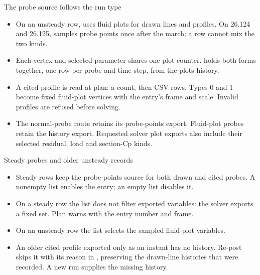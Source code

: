 \begin{frame}{The probe source follows the run type}
\begin{itemize}\small
  \item On an unsteady row,  uses
        fluid plots for drawn lines and  profiles.
        On 26.124 and 26.125,  samples probe points
        once after the march; a row cannot mix the two kinds.
  \item Each vertex and selected parameter shares one plot counter.
         holds both forms together,
        one row per probe and time step, from the plots history.
  \item A cited profile is read at plan: a count, then 
        CSV rows. Types 0 and 1 become fixed fluid-plot vertices with the
        entry's frame and scale. Invalid profiles are refused before solving.
  \item The normal-probe route retains its probe-points export. Fluid-plot
        probes retain the history export. Requested solver plot exports also
        include their selected residual, load and section-Cp kinds.
\end{itemize}
\end{frame}

\begin{frame}{Steady probes and older unsteady records}
\begin{itemize}\small
  \item Steady rows keep the probe-points source for both drawn and cited probes.
        A nonempty  list enables the entry; an empty list disables it.
  \item On a steady row the list does not filter exported variables:
        the solver exports a fixed set. Plan warns with the entry number and frame.
  \item On an unsteady row the list selects the sampled fluid-plot variables.
  \item An older cited profile exported only as an instant has no history.
        Re-post skips it with its reason in , preserving
        the drawn-line histories that were recorded. A new run supplies
        the missing history.
\end{itemize}
\end{frame}

